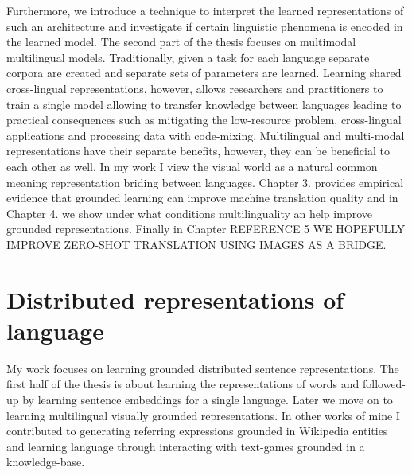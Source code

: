 Furthermore, we introduce a technique to interpret the learned representations of such an
architecture and investigate if certain linguistic phenomena is encoded in the learned model.
The second part of the thesis focuses on multimodal multilingual models.
Traditionally, given a task for each language separate corpora are created and separate sets of parameters are learned.
Learning shared cross-lingual representations, however, allows researchers and practitioners
to train a single model allowing to transfer knowledge between languages leading to practical consequences
such as mitigating the low-resource problem, cross-lingual applications and processing data with code-mixing.
Multilingual and multi-modal representations have their separate benefits, however, they can be beneficial
to each other as well. In my work I view the visual world as a natural common meaning representation briding
between languages. Chapter 3. provides empirical evidence that grounded learning can improve machine
translation quality and in Chapter 4. we show under what conditions multilinguality an help improve grounded
representations. Finally in Chapter REFERENCE 5 WE HOPEFULLY IMPROVE ZERO-SHOT TRANSLATION USING IMAGES AS A BRIDGE.


\section{Distributed representations of language}
My work focuses on learning grounded distributed sentence representations.
The first half of the thesis is about learning the representations of words and followed-up by learning sentence embeddings for a single language. Later we move on to learning multilingual visually grounded representations. In other works of mine I contributed to generating referring expressions grounded in Wikipedia entities and learning language through interacting with text-games grounded in a knowledge-base.

